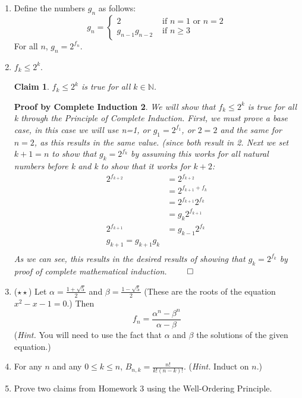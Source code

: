 \documentclass[10pt]{letter}
\newtheorem{PBCI}{Proof by Complete Induction}
\newtheorem{claim}{Claim}
\theoremstyle{definition}
\begin{document}
\begin{description}
\begin{enumerate}
\begin{PBCI}
\begin{align*}
&=a_n+180 \tag{Substituted using Formula 2}\\
\end{align*}
Therefore, as seen above, it can be seen through complete induction that $(n-2)\cdot 180^\circ$ is valid for convex n-gons. $\qed$
\end{PBCI}
		\item Define the numbers $g_n$ as follows:
				\begin{equation*}
					g_n=\begin{cases}
							2& \text{ if } n=1\text{ or }n=2\\
							g_{n-1}g_{n-2}&\text{ if }n\geq 3
						\end{cases}
				\end{equation*}
				For all $n$, $g_n=2^{f_n}$.
		\item $f_k\leq 2^k$.
\begin{claim}
$f_k\leq 2^k$ is true for all $k \in \mathbb{N}$.
\end{claim}
\begin{PBCI}
We will show that $f_k\leq 2^k$ is true for all k through the Principle of Complete Induction. First, we must prove a base case, in this case we will use n=1, or $g_1=2^{f_1}$, or $2=2$ and the same for $n=2$, as this results in the same value. (since both result in 2. Next we set $k+1=n$ to show that $g_k=2^{f_k}$ by assuming this works for all natural numbers before k and k to show that it works for $k+2$: \\
\begin{align*}
2^{f_{k+2}}&=2^{f_{k+2}} \\
&=2^{f_{k+1}+f_{k}} \\
&=2^{f_{k+1}}2^{f_{k}} \\
&=g_k2^{f_{k+1}}  \tag{Used inductive hypothesis for substitution}\\
2^{f_{k+1}}&=g_{k-1}2^{f_k} \tag{Since we assume that claim is true for values less than k, we can subtract 1 from all ks and the equation will still be true}\\
g_{k+1}=g_{k+1}g_k \tag{Substituted using inductive hypothesis}\\
\end{align*}
As we can see, this results in the desired results of showing that $g_k=2^{f_k}$ by proof of complete mathematical induction. $\qed$

\end{PBCI}
		\item ($\star\star$) Let $\alpha=\frac{1+\sqrt{5}}{2}$ and $\beta=\frac{1-\sqrt{5}}{2}$ (These are the roots of the equation $x^2-x-1=0$.) Then
				$$f_n=\frac{\alpha^n-\beta^n}{\alpha-\beta}$$
				({\em Hint.} You will need to use the fact that $\alpha$ and $\beta$ the solutions of the given equation.)
			\item For any $n$ and any $0\leq k\leq n$, $B_{n,k}=\frac{n!}{k!(n-k)!}$. ({\em Hint.} Induct on $n$.)
			\item Prove two claims from Homework 3 using the Well-Ordering Principle.
		\end{enumerate}
		\end{description}
		
\end{document}
